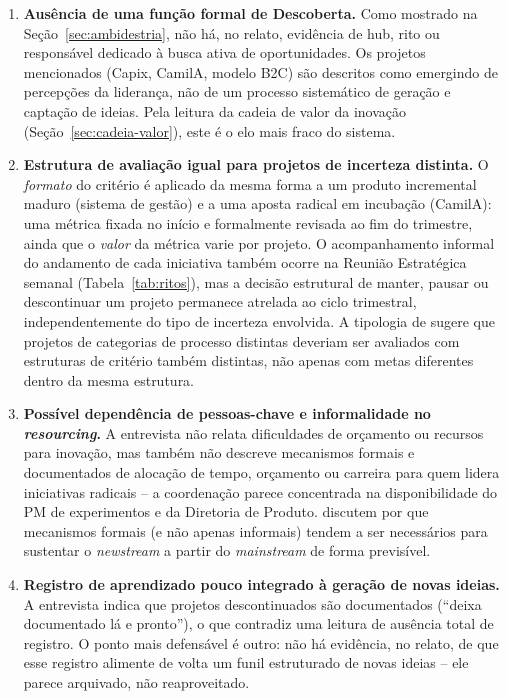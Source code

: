 \begin{enumerate}
  \item \textbf{Ausência de uma função formal de Descoberta.} Como mostrado na Seção~\ref{sec:ambidestria}, não há, no relato, evidência de hub, rito ou responsável dedicado à busca ativa de oportunidades. Os projetos mencionados (Capix, CamilA, modelo B2C) são descritos como emergindo de percepções da liderança, não de um processo sistemático de geração e captação de ideias. Pela leitura da cadeia de valor da inovação (Seção~\ref{sec:cadeia-valor}), este é o elo mais fraco do sistema.
  \item \textbf{Estrutura de avaliação igual para projetos de incerteza distinta.} O \textit{formato} do critério é aplicado da mesma forma a um produto incremental maduro (sistema de gestão) e a uma aposta radical em incubação (CamilA): uma métrica fixada no início e formalmente revisada ao fim do trimestre, ainda que o \textit{valor} da métrica varie por projeto. O acompanhamento informal do andamento de cada iniciativa também ocorre na Reunião Estratégica semanal (Tabela~\ref{tab:ritos}), mas a decisão estrutural de manter, pausar ou descontinuar um projeto permanece atrelada ao ciclo trimestral, independentemente do tipo de incerteza envolvida. A tipologia de \textcite{salerno2015} sugere que projetos de categorias de processo distintas deveriam ser avaliados com estruturas de critério também distintas, não apenas com metas diferentes dentro da mesma estrutura.
  \item \textbf{Possível dependência de pessoas-chave e informalidade no \textit{resourcing}.} A entrevista não relata dificuldades de orçamento ou recursos para inovação, mas também não descreve mecanismos formais e documentados de alocação de tempo, orçamento ou carreira para quem lidera iniciativas radicais -- a coordenação parece concentrada na disponibilidade do PM de experimentos e da Diretoria de Produto. \textcite{salerno2025} discutem por que mecanismos formais (e não apenas informais) tendem a ser necessários para sustentar o \textit{newstream} a partir do \textit{mainstream} de forma previsível.
  \item \textbf{Registro de aprendizado pouco integrado à geração de novas ideias.} A entrevista indica que projetos descontinuados são documentados (``deixa documentado lá e pronto''), o que contradiz uma leitura de ausência total de registro. O ponto mais defensável é outro: não há evidência, no relato, de que esse registro alimente de volta um funil estruturado de novas ideias -- ele parece arquivado, não reaproveitado.

\end{enumerate}
